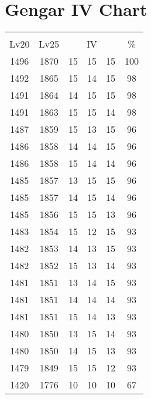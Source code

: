 \documentclass{article}%
\begin{document}
%
\normalsize%
\section{Gengar IV Chart}%
\label{sec:Gengar IV Chart}%
\renewcommand{\arraystretch}{1.5}%
\begin{tabular}{|c|c|c|c|c|c|}%
\hline%
\multicolumn{6}{|c|}{\textcolor{white}{ 
\linebreak{Gengar}
}%
\cellcolor{black}}\\%
\multicolumn{1}{|c}{Lv20}&\multicolumn{1}{c|}{Lv25}&\multicolumn{3}{c|}{IV}&\multicolumn{1}{|c|}{\%}\\%
\hline%
\rowcolor{color100}%
1496&1870&15&15&15&100\\%
\hline%
\rowcolor{color98}%
1492&1865&15&14&15&98\\%
\hline%
\rowcolor{color98}%
1491&1864&14&15&15&98\\%
\hline%
\rowcolor{color98}%
1491&1863&15&15&14&98\\%
\hline%
\rowcolor{color96}%
1487&1859&15&13&15&96\\%
\hline%
\rowcolor{color96}%
1486&1858&14&14&15&96\\%
\hline%
\rowcolor{color96}%
1486&1858&15&14&14&96\\%
\hline%
\rowcolor{color96}%
1485&1857&13&15&15&96\\%
\hline%
\rowcolor{color96}%
1485&1857&14&15&14&96\\%
\hline%
\rowcolor{color96}%
1485&1856&15&15&13&96\\%
\hline%
\rowcolor{color93}%
1483&1854&15&12&15&93\\%
\hline%
\rowcolor{color93}%
1482&1853&14&13&15&93\\%
\hline%
\rowcolor{color93}%
1482&1852&15&13&14&93\\%
\hline%
\rowcolor{color93}%
1481&1851&13&14&15&93\\%
\hline%
\rowcolor{color93}%
1481&1851&14&14&14&93\\%
\hline%
\rowcolor{color93}%
1481&1851&15&14&13&93\\%
\hline%
\rowcolor{color93}%
1480&1850&13&15&14&93\\%
\hline%
\rowcolor{color93}%
1480&1850&14&15&13&93\\%
\hline%
\rowcolor{color93}%
1479&1849&15&15&12&93\\%
\hline%
\rowcolor{color91}%
1420&1776&10&10&10&67\\%
\end{tabular}

%
\end{document}
